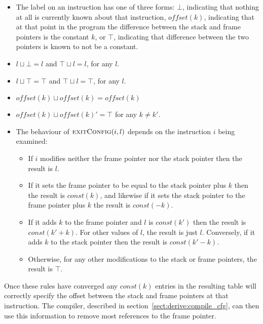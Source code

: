 \begin{itemize}
\item
  The label on an instruction has one of three forms: $\bot$,
  indicating that nothing at all is currently known about that
  instruction, $offset(k)$, indicating that at that point in the
  program the difference between the stack and frame pointers is the
  constant $k$, or $\top$, indicating that difference between the two
  pointers is known to not be a constant.
\item
  $l \sqcup \bot = l$ and $\top \sqcup l = l$, for any $l$.
\item
  $l \sqcup \top = \top$ and $\top \sqcup l = \top$, for any $l$.
\item
  $offset(k) \sqcup offset(k) = offset(k)$
\item
  $offset(k) \sqcup offset(k)' = \top$ for any $k \not= k'$.
\item
  The behaviour of $\textsc{exitConfig}(i, l)$ depends on the
  instruction $i$ being examined:

  \begin{itemize}
  \item If $i$ modifies neither the frame pointer nor the stack
    pointer then the result is $l$.
  \item If it sets the frame pointer to be equal to the stack pointer
    plus $k$ then the result is $const(k)$, and likewise if it sets
    the stack pointer to the frame pointer plus $k$ the result is
    $const(-k)$.
  \item If it adds $k$ to the frame pointer and $l$ is $const(k')$
    then the result is $const(k'+k)$.  For other values of $l$, the
    result is just $l$.  Conversely, if it adds $k$ to the stack
    pointer then the result is $const(k'-k)$.
  \item Otherwise, for any other modifications to the stack or frame
    pointers, the result is $\top$.
  \end{itemize}
\end{itemize}

Once these rules have converged any $const(k)$ entries in the
resulting table will correctly specify the offset between the stack
and frame pointers at that instruction.  The {\StateMachine} compiler,
described in section~\ref{sect:derive:compile_cfg}, can then use this
information to remove most references to the frame pointer.


